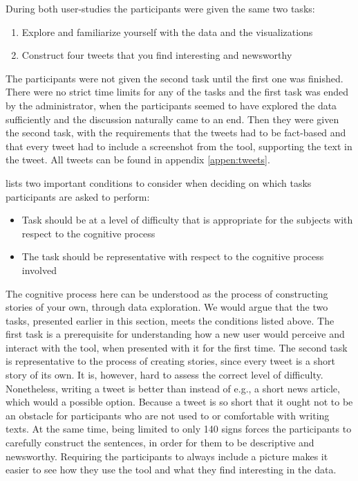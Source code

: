 \documentclass{acmtog} %
\begin{document}
During both user-studies the participants were given the same two tasks:
\begin{enumerate}
\item Explore and familiarize yourself with the data and the visualizations
\item Construct four tweets that you find interesting and newsworthy
\end{enumerate}

The participants were not given the second task until the first one was finished. There were no strict time limits for any of the tasks and the first task was ended by the administrator, when the participants seemed to have explored the data sufficiently and the discussion naturally came to an end. Then they were given the second task, with the requirements that the tweets had to be fact-based and that every tweet had to include a screenshot from the tool, supporting the text in the tweet. All tweets can be found in appendix \ref{appen:tweets}.

\citet{someren1994think} lists two important conditions to consider when deciding on which tasks participants are asked to perform:
\begin{itemize}
\item Task should be at a level of difficulty that is appropriate for the subjects with respect to the cognitive process
\item The task should be representative with respect to the cognitive process involved
\end{itemize}

The cognitive process here can be understood as the process of constructing stories of your own, through data exploration. We would argue that the two tasks, presented earlier in this section, meets the conditions listed above. The first task is a prerequisite for understanding how a new user would perceive and interact with the tool, when presented with it for the first time. The second task is representative to the process of creating stories, since every tweet is a short story of its own. It is, however, hard to assess the correct level of difficulty. Nonetheless, writing a tweet is better than instead of e.g., a short news article, which would a possible option. Because a tweet is so short that it ought not to be an obstacle for participants who are not used to or comfortable with writing texts. At the same time, being limited to only 140 signs forces the participants to carefully construct the sentences, in order for them to be descriptive and newsworthy. Requiring the participants to always include a picture makes it easier to see how they use the tool and what they find interesting in the data.
\end{document}

